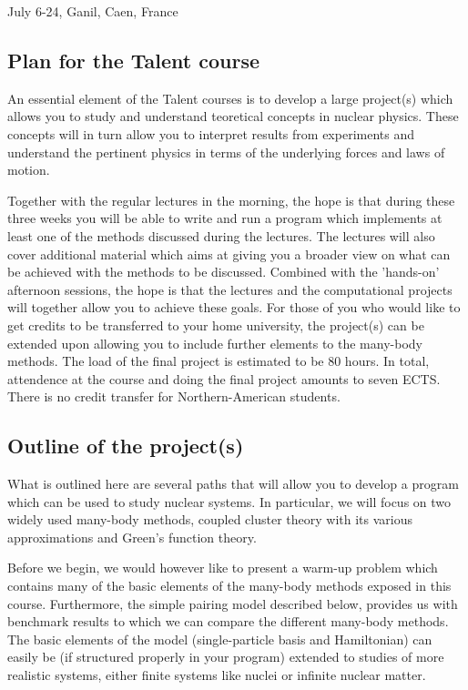 \documentclass[%
twoside,                 %
final,                   %
10pt]{article}
\begin{document}

\begin{center} %
July 6-24, Ganil, Caen, France
\end{center}

\vspace{1cm}


\subsection{Plan for the Talent course}
An essential element of the Talent courses is to develop a large project(s) which allows you to study and understand
teoretical concepts in nuclear physics.  
These concepts will in turn allow you to interpret results from experiments and understand the pertinent physics in terms of the underlying forces and laws of motion.

Together with the regular lectures in the morning, the hope is that
during these three weeks you will be able to write and run a program
which implements at least one of the methods discussed during the
lectures.  The lectures will also cover additional material which aims
at giving you a broader view on what can be achieved with the methods
to be discussed. Combined with the 'hands-on' afternoon sessions, the
hope is that the lectures and the computational projects will together
allow you to achieve these goals. For those of you who would like to
get credits to be transferred to your home university, the project(s)
can be extended upon allowing you to include further elements to the
many-body methods. The load of the final project is estimated to be 
80 hours. In total, attendence at the course and doing
the final project amounts to seven ECTS. There is no credit transfer
for Northern-American students.

\subsection{Outline of the project(s)}

What is outlined here are several paths that will allow you to develop
a program which can be used to study nuclear systems. In particular,
we will focus on two widely used many-body methods, coupled cluster
theory with its various approximations and Green's function theory.

Before we begin, we would however like to present a warm-up problem which 
contains
many of the basic elements of the many-body methods exposed in this course. Furthermore, the simple pairing 
model described below, provides us with  benchmark results to which we can compare 
the different many-body methods. The basic elements of the model (single-particle basis and Hamiltonian)
can easily be (if structured properly in your program) extended to studies of more realistic systems, either 
finite systems like nuclei or infinite nuclear matter. 
\end{document}
